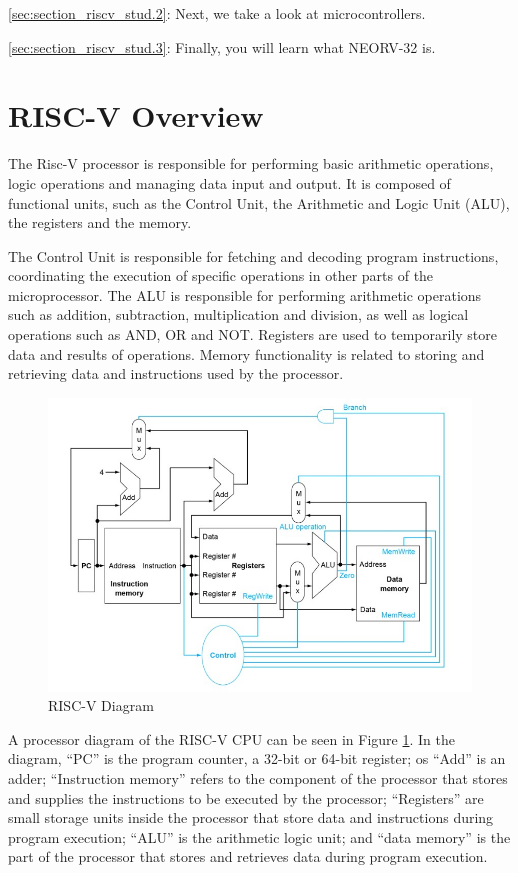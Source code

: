     \autoref{sec:section_riscv_stud.2}:  Next, we take a look at microcontrollers.

    \autoref{sec:section_riscv_stud.3}:  Finally, you will learn what NEORV-32 is.  


    \section{RISC-V Overview} \label{sec:section_riscv_stud.1}
    
        The Risc-V processor is responsible for performing basic arithmetic operations, logic operations and managing data input and output. It is composed of functional units, such as the Control Unit, the Arithmetic and Logic Unit (ALU), the registers and the memory.
        
        The Control Unit is responsible for fetching and decoding program instructions, coordinating the execution of specific operations in other parts of the microprocessor. The ALU is responsible for performing arithmetic operations such as addition, subtraction, multiplication and division, as well as logical operations such as AND, OR and NOT. Registers are used to temporarily store data and results of operations. Memory functionality is related to storing and retrieving data and instructions used by the processor. 
    
         \begin{figure}[!b]
        \centering
        \includegraphics[width = 0.8
        \textwidth]{figures/riscv/risc_2.jpg}
            \caption{\label{risc_2_std} RISC-V Diagram}
        \end{figure}
                    
        
        A processor diagram of the RISC-V CPU can be seen in Figure \ref{risc_2_std}. In the diagram, ``PC'' is the program counter, a 32-bit or 64-bit register; os ``Add'' is an adder; ``Instruction memory'' refers to the component of the processor that stores and supplies the instructions to be executed by the processor; ``Registers'' are small storage units inside the processor that store data and instructions during program execution; ``ALU'' is the arithmetic logic unit; and ``data memory'' is the part of the processor that stores and retrieves data during program execution.
        
